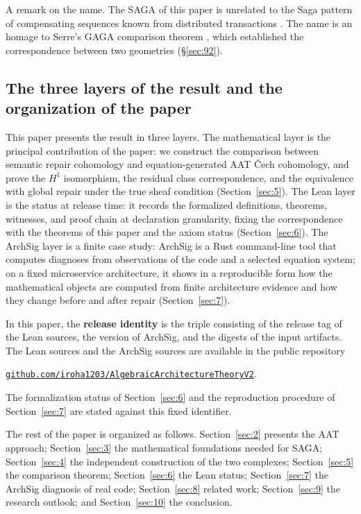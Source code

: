 A remark on the name. The SAGA of this paper is unrelated to the Saga
pattern of compensating sequences known from distributed transactions
\citep{garciamolina1987sagas}. The name is an homage to Serre's GAGA
comparison theorem \citep{serre1956gaga}, which established the
correspondence between two geometries (\S\ref{sec:92}).

\subsection{The three layers of the result and the organization of the paper}\label{sec:13}

This paper presents the result in three layers. The mathematical layer is
the principal contribution of the paper: we construct the comparison
between semantic repair cohomology and equation-generated AAT \v{C}ech
cohomology, and prove the $H^1$ isomorphism, the residual class
correspondence, and the equivalence with global repair under the true
sheaf condition (Section~\ref{sec:5}). The Lean layer is the status at
release time: it records the formalized definitions, theorems, witnesses,
and proof chain at declaration granularity, fixing the correspondence with
the theorems of this paper and the axiom status (Section~\ref{sec:6}). The
ArchSig layer is a finite case study: ArchSig is a Rust command-line tool
that computes diagnoses from observations of the code and a selected
equation system; on a fixed microservice architecture, it shows in a
reproducible form how the mathematical objects are computed from finite
architecture evidence and how they change before and after repair
(Section~\ref{sec:7}).

In this paper, the \textbf{release identity} is the triple consisting of
the release tag of the Lean sources, the version of ArchSig, and the
digests of the input artifacts. The Lean sources and the ArchSig sources
are available in the public repository
\begin{center}
\href{https://github.com/iroha1203/AlgebraicArchitectureTheoryV2}{\nolinkurl{github.com/iroha1203/AlgebraicArchitectureTheoryV2}}.
\end{center}
The formalization status of Section~\ref{sec:6} and the reproduction
procedure of Section~\ref{sec:7} are stated against this fixed identifier.

The rest of the paper is organized as follows. Section~\ref{sec:2} presents
the AAT approach; Section~\ref{sec:3} the mathematical foundations needed
for SAGA; Section~\ref{sec:4} the independent construction of the two
complexes; Section~\ref{sec:5} the comparison theorem; Section~\ref{sec:6}
the Lean status; Section~\ref{sec:7} the ArchSig diagnosis of real code;
Section~\ref{sec:8} related work; Section~\ref{sec:9} the research
outlook; and Section~\ref{sec:10} the conclusion.
